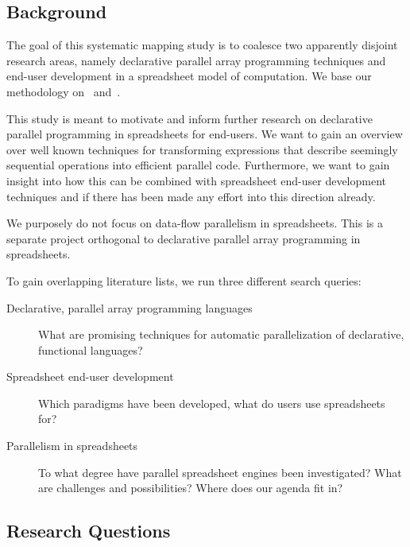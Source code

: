 \documentclass[a4paper]{article}
\begin{document}
\subsection{Background}
\label{sec:background}

The goal of this systematic mapping study is to coalesce two
apparently disjoint research areas, namely declarative parallel array
programming techniques and end-user development in a spreadsheet model
of computation. We base our methodology on~\citet{keele2007guidelines}
and~\citet{petersen2008systematic}.

This study is meant to motivate and inform further research on
declarative parallel programming in spreadsheets for end-users. We
want to gain an overview over well known techniques for transforming
expressions that describe seemingly sequential operations into
efficient parallel code. Furthermore, we want to gain insight into how
this can be combined with spreadsheet end-user development techniques
and if there has been made any effort into this direction
already. 

We purposely do not focus on data-flow parallelism in
spreadsheets. This is a separate project orthogonal to declarative
parallel array programming in spreadsheets.

To gain overlapping literature lists, we run three different search queries:

\begin{description}
\item[Declarative, parallel array programming languages] What are
  promising techniques for automatic parallelization of declarative,
  functional languages?
\item[Spreadsheet end-user development] Which paradigms have been
  developed, what do users use spreadsheets for?
\item[Parallelism in spreadsheets] To what degree have parallel
  spreadsheet engines been investigated? What are challenges and
  possibilities? Where does our agenda fit in?
\end{description}

\subsection{Research Questions}
\label{sec:research-questions}
\end{document}
